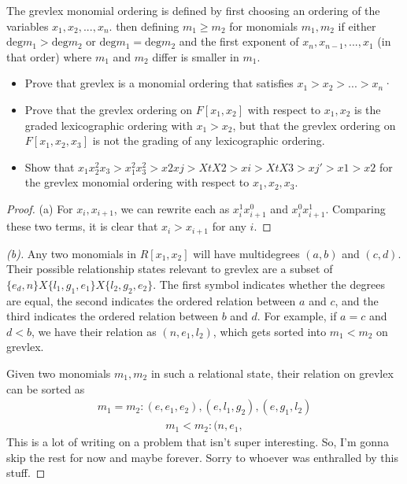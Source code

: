 \documentclass[10pt]{article}
\newenvironment{problem}[2][Problem]{\begin{trivlist}
		\item[\hskip \labelsep {\bfseries #1}\hskip \labelsep {\bfseries #2.}]}{\end{trivlist}}
\begin{document}
	\begin{problem}{6.5}
		The grevlex monomial ordering is defined by first choosing an ordering of the variables ${x_1, x_2, ..., x_n }$. then defining $m_1 \geq m_2$ for monomials $m_1, m_2$ if either $\text{deg}m_1 > \text{deg}m_2$ or $\text{deg}m_1 = \text{deg}m_2$ and the first exponent of $x_n, x_{n-1}, ..., x_1$ (in that order) where $m_1$
		and $m_2$ differ is smaller in $m_1$.
		\begin{itemize}
			\item[\textbf{(a)}] Prove that grevlex is a monomial ordering that satisfies $x_1 > x_2 > ... > x_n$·
			\item[\textbf{(b)}] Prove that the grevlex ordering on $F[x_1, x_2]$ with respect to ${x_1 , x_2}$ is the graded lexicographic ordering with $x_1 > x_2$, but that the grevlex ordering on $F[x_1, x_2, x_3]$ is not the grading of any lexicographic ordering.
			\item[\textbf{(c)}] Show that $x_1x_2^2x_3 > x_1^2x_3^2 > x2xj > XtX2 > xi > XtX3 > xj' > x 1 > x2$ for the grevlex monomial ordering with respect to ${x_1, x_2, x_3}$.
		\end{itemize}
		\begin{proof}{(a)}
			For $x_i, x_{i+1}$, we can rewrite each as $x_i^1x_{i+1}^0$ and $x_i^0x_{i+1}^1$. Comparing these two terms, it is clear that $x_i > x_{i+1}$ for any $i$.
		\end{proof}
		\begin{proof}[(b)]
			Any two monomials in $R[x_1,x_2]$ will have multidegrees $(a,b)$ and $(c,d)$. Their possible relationship states relevant to grevlex are a subset of $\{e_d,n\}X\{l_1,g_1,e_1\}X\{l_2,g_2,e_2\}$. The first symbol indicates whether the degrees are equal, the second indicates the ordered relation between $a$ and $c$, and the third indicates the ordered relation between $b$ and $d$. For example, if $a=c$ and $d<b$, we have their relation as $(n, e_1, l_2)$, which gets sorted into $m_1 < m_2$ on grevlex.
			
			Given two monomials $m_1, m_2$ in such a relational state, their relation on grevlex can be sorted as
			\begin{align*}
				m_1 = m_2 : (e, e_1, e_2), (e, l_1, g_2), (e, g_1, l_2)
			\end{align*}
			\begin{align*}
				m_1 < m_2 : (n, e_1, 
			\end{align*}
			This is a lot of writing on a problem that isn't super interesting. So, I'm gonna skip the rest for now and maybe forever. Sorry to whoever was enthralled by this stuff.
		\end{proof}
	\end{problem}
	
\end{document}
